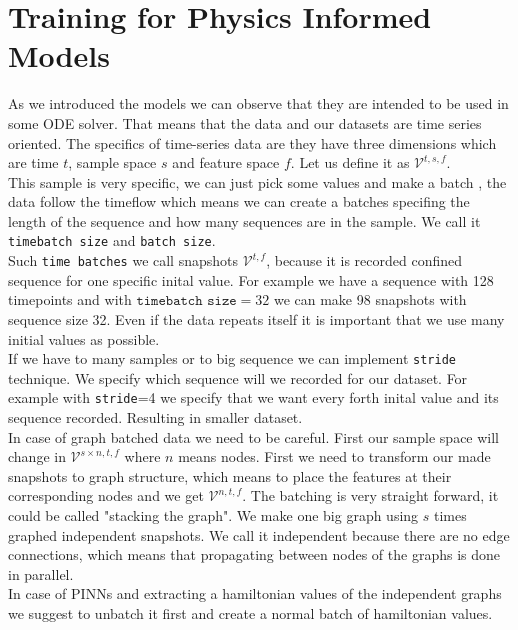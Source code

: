 \section{Training for Physics Informed Models}
As we introduced the models we can observe that they are intended to be used in some ODE solver. That means that the data and our datasets are time series oriented. The specifics of time-series data are they have three dimensions which are time $t$, sample space $s$ and feature space $f$. Let us define it as $\mathcal{V}^{t,s,f}$.\\
This sample is very specific, we can just pick some values and make a batch , the data follow the timeflow which means we can create a batches specifing the length of the sequence and how many sequences are in the sample. We call it \texttt{timebatch size} and \texttt{batch size}.\\
Such \texttt{time batches} we call snapshots $\mathcal{V}^{t,f}$, because it is recorded confined sequence for one specific inital value. For example we have a sequence with 128 timepoints and with $\texttt{timebatch size} = 32$ we can make 98 snapshots with sequence size 32. Even if the data repeats itself it is important that we use many initial values as possible.\\
If we have to many samples or to big sequence we can implement \texttt{stride} technique. We specify which sequence will we recorded for our dataset. For example with \texttt{stride}=4 we specify that we want every forth inital value and its sequence recorded. Resulting in smaller dataset.\\
In case of graph batched data we need to be careful. First our sample space will change in $\mathcal{V}^{s \times n,t,f}$ where  $n$ means nodes. First we need to transform our made snapshots to graph structure, which means to place the features at their corresponding nodes and we get $\mathcal{V}^{n,t,f}$. The batching is very straight forward, it could be called "stacking the graph". We make one big graph using $s$ times graphed independent snapshots. We call it independent because there are no edge connections, which means that propagating between nodes of the graphs is done in parallel.\\
In case of PINNs and extracting a hamiltonian values of the independent graphs we suggest to unbatch it first and create a normal batch of hamiltonian values.      


